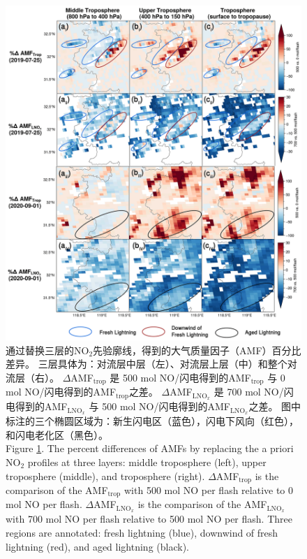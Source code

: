 \begin{figure}[!htbp]
    \centering
    \includegraphics[width=12cm]{./figures/china_s5p_amf_diff.png}
    \caption{
    通过替换三层的NO$_2$先验廓线，得到的大气质量因子（AMF）百分比差异。
    三层具体为：对流层中层（左）、对流层上层（中）和整个对流层（右）。
     $\Delta$AMF$_\textrm{trop}$ 是 500 mol NO/闪电得到的AMF$_\textrm{trop}$ 与 0 mol NO/闪电得到的AMF$_\textrm{trop}$之差。
     $\Delta$AMF$_\textrm{LNO$_x$}$ 是 700 mol NO/闪电得到的AMF$_\textrm{LNO$_x$}$ 与 500 mol NO/闪电得到的AMF$_\textrm{LNO$_x$}$之差。
     图中标注的三个椭圆区域为：新生闪电区（蓝色），闪电下风向（红色），和闪电老化区（黑色）。\\
    Figure \ref{fig:china_s5p_amf_diff}. The percent differences of AMFs by replacing the a priori NO$_2$ profiles at three layers:
    middle troposphere (left), upper troposphere (middle), and troposphere (right).
    $\Delta$AMF$_\textrm{trop}$ is the comparison of the AMF$_\textrm{trop}$ with 500 mol NO per flash relative to 0 mol NO per flash.
    $\Delta$AMF$_\textrm{LNO$_x$}$ is the comparison of the AMF$_\textrm{LNO$_x$}$ with 700 mol NO per flash relative to 500 mol NO per flash.
    Three regions are annotated: fresh lightning (blue),
    downwind of fresh lightning (red),
    and aged lightning (black).
    }
    \label{fig:china_s5p_amf_diff}
\end{figure}


